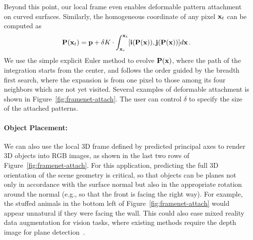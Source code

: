 Beyond this point, our local frame even enables deformable pattern attachment on curved surfaces. Similarly, the homogeneous coordinate of any pixel $\mathbf{x}_t$ can be computed as
\begin{equation}
    \mathbf{P}(\mathbf{x}_t)=\mathbf{p} + \delta K \cdot\int_{\mathbf{x}_c}^{\mathbf{x}_t} [\textbf{i}(\mathbf{P}(\mathbf{x})),\textbf{j}(\mathbf{P}(\mathbf{x}))] d\mathbf{x}\,.
\end{equation}
We use the simple explicit Euler method to evolve $\mathbf{P}(\mathbf{x})$, where the path of the integration starts from the center, and follows the order guided by the breadth first search, where the expansion is from one pixel to those among its four neighbors which are not yet visited. Several examples of deformable attachment is shown in Figure~\ref{fig:framenet-attach}. The user can control $\delta$ to specify the size of the attached patterns.

\vspace{-0.1in}
\paragraph{Object Placement:} We can also use the local 3D frame defined by predicted principal axes to render 3D objects into RGB images, as shown in the last two rows of Figure~\ref{fig:framenet-attach}.  For this application, predicting the full 3D orientation of the scene geometry is critical, so that objects can be planes not only in accordance with the surface normal but also in the appropriate rotation around the normal (e.g., so that the front is facing the right way).   For example, the stuffed animals in the bottom left of Figure~\ref{fig:framenet-attach} would appear unnatural if they were facing the wall. This could also ease mixed reality data augmentation for vision tasks, where existing methods require the depth image for plane detection~\cite{wang2019normalized}.

